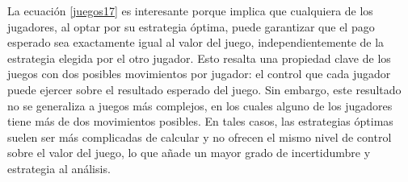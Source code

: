 La ecuación \eqref{juegos17} es interesante porque implica que cualquiera de los jugadores, al optar por su estrategia óptima, puede garantizar que el pago esperado sea exactamente igual al valor del juego, independientemente de la estrategia elegida por el otro jugador. Esto resalta una propiedad clave de los juegos con dos posibles movimientos por jugador: el control que cada jugador puede ejercer sobre el resultado esperado del juego. Sin embargo, este resultado no se generaliza a juegos más complejos, en los cuales alguno de los jugadores tiene más de dos movimientos posibles. En tales casos, las estrategias óptimas suelen ser más complicadas de calcular y no ofrecen el mismo nivel de control sobre el valor del juego, lo que añade un mayor grado de incertidumbre y estrategia al análisis.

\newpage

